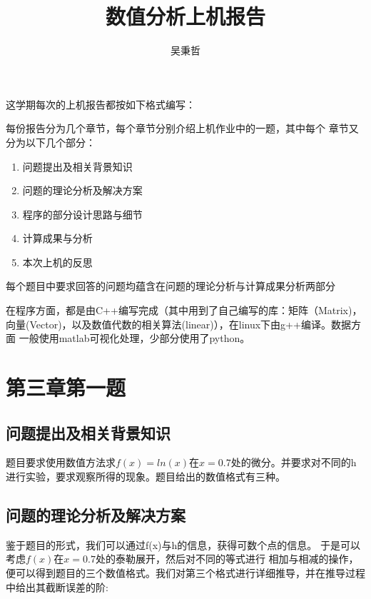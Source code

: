 \documentclass[10pt,a4paper]{ctexart}
\author{吴秉哲}
\title{数值分析上机报告}
\begin{document}
\maketitle
这学期每次的上机报告都按如下格式编写：

每份报告分为几个章节，每个章节分别介绍上机作业中的一题，其中每个
章节又分为以下几个部分：
\begin{enumerate}
\item 问题提出及相关背景知识
\item 问题的理论分析及解决方案
\item 程序的部分设计思路与细节
\item 计算成果与分析
\item 本次上机的反思
\end{enumerate}
每个题目中要求回答的问题均蕴含在问题的理论分析与计算成果分析两部分

在程序方面，都是由C++编写完成（其中用到了自己编写的库：矩阵（Matrix)，向量(Vector)，以及数值代数的相关算法(linear)），在linux下由g++编译。数据方面
一般使用matlab可视化处理，少部分使用了python。
\section{第三章第一题}
\subsection{问题提出及相关背景知识}
题目要求使用数值方法求$f(x)=ln(x)$在$x=0.7$处的微分。并要求对不同的h进行实验，要求观察所得的现象。题目给出的数值格式有三种。
\subsection{问题的理论分析及解决方案}
鉴于题目的形式，我们可以通过f(x)与h的信息，获得可数个点的信息。
于是可以考虑$f(x)$在$x=0.7$处的泰勒展开，然后对不同的等式进行
相加与相减的操作，便可以得到题目的三个数值格式。我们对第三个格式进行详细推导，并在推导过程中给出其截断误差的阶:
\end{document}
